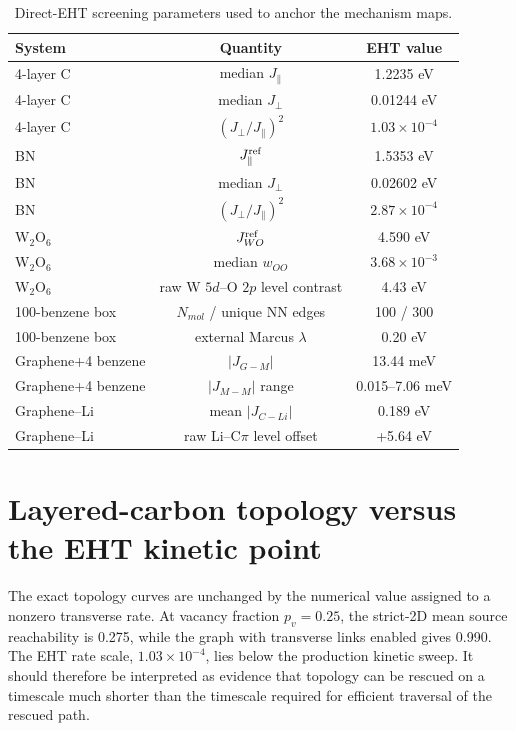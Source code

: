 \documentclass[aps,prmaterials,onecolumn,amsmath,amssymb,superscriptaddress]{revtex4-2}
\begin{document}
\begin{table}[h]
\caption{Direct-EHT screening parameters used to anchor the mechanism maps.}
\begin{ruledtabular}
\begin{tabular}{lcc}
System & Quantity & EHT value\\\hline
4-layer C & median $J_\parallel$ & 1.2235 eV\\
4-layer C & median $J_\perp$ & 0.01244 eV\\
4-layer C & $(J_\perp/J_\parallel)^2$ & $1.03\times10^{-4}$\\
BN & $J_\parallel^{\rm ref}$ & 1.5353 eV\\
BN & median $J_\perp$ & 0.02602 eV\\
BN & $(J_\perp/J_\parallel)^2$ & $2.87\times10^{-4}$\\
W$_2$O$_6$ & $J_{WO}^{\rm ref}$ & 4.590 eV\\
W$_2$O$_6$ & median $w_{OO}$ & $3.68\times10^{-3}$\\
W$_2$O$_6$ & raw W $5d$--O $2p$ level contrast & 4.43 eV\\
100-benzene box & $N_{mol}$ / unique NN edges & 100 / 300\\
100-benzene box & external Marcus $\lambda$ & 0.20 eV\\
Graphene+4 benzene & $|J_{G-M}|$ & 13.44 meV\\
Graphene+4 benzene & $|J_{M-M}|$ range & 0.015--7.06 meV\\
Graphene--Li & mean $|J_{C-Li}|$ & 0.189 eV\\
Graphene--Li & raw Li--C$\pi$ level offset & +5.64 eV\\
\end{tabular}
\end{ruledtabular}
\end{table}

\section{Layered-carbon topology versus the EHT kinetic point}
The exact topology curves are unchanged by the numerical value assigned to a nonzero transverse rate. At vacancy fraction $p_v=0.25$, the strict-2D mean source reachability is 0.275, while the graph with transverse links enabled gives 0.990. The EHT rate scale, $1.03\times10^{-4}$, lies below the production kinetic sweep. It should therefore be interpreted as evidence that topology can be rescued on a timescale much shorter than the timescale required for efficient traversal of the rescued path.
\end{document}
